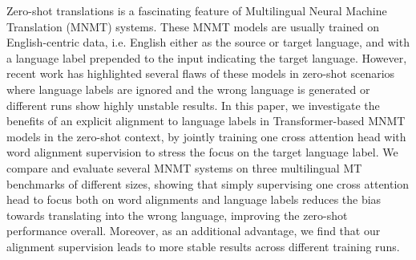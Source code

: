 Zero-shot translations is a fascinating feature of Multilingual Neural Machine Translation (MNMT) systems. These MNMT models are usually trained on English-centric data, i.e. English either as the source or target language, and with a language label prepended to the input indicating the target language. However, recent work has highlighted several flaws of these models in zero-shot scenarios where language labels are ignored and the wrong language is generated or different runs show highly unstable results. In this paper, we investigate the benefits of an explicit alignment to language labels in Transformer-based MNMT models in the zero-shot context, by jointly training one cross attention head with word alignment supervision to stress the focus on the target language label. We compare and evaluate several MNMT systems on three multilingual MT benchmarks of different sizes, showing that simply supervising one cross attention head to focus both on word alignments and language labels reduces the bias towards translating into the wrong language, improving the zero-shot performance overall. Moreover, as an additional advantage, we find that our alignment supervision leads to more stable results across different training runs.
